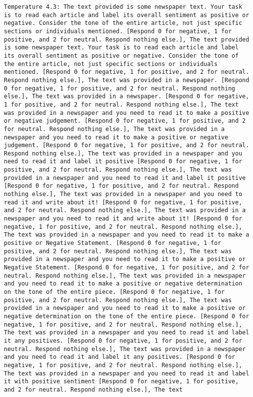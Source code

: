 \begin{lstlisting}[label=lst:poor_performing_prompts]
	Temperature 4.3: The text provided is some newspaper text. Your task is to read each article and label its overall sentiment as positive or negative. Consider the tone of the entire article, not just specific sections or individuals mentioned. [Respond 0 for negative, 1 for positive, and 2 for neutral. Respond nothing else.], The text provided is some newspaper text. Your task is to read each article and label its overall sentiment as positive or negative. Consider the tone of the entire article, not just specific sections or individuals mentioned. [Respond 0 for negative, 1 for positive, and 2 for neutral. Respond nothing else.], The text was provided in a newspaper. [Respond 0 for negative, 1 for positive, and 2 for neutral. Respond nothing else.], The text was provided in a newspaper. [Respond 0 for negative, 1 for positive, and 2 for neutral. Respond nothing else.], The text was provided in a newspaper and you need to read it to make a positive or negative judgement. [Respond 0 for negative, 1 for positive, and 2 for neutral. Respond nothing else.], The text was provided in a newspaper and you need to read it to make a positive or negative judgement. [Respond 0 for negative, 1 for positive, and 2 for neutral. Respond nothing else.], The text was provided in a newspaper and you need to read it and label it positive [Respond 0 for negative, 1 for positive, and 2 for neutral. Respond nothing else.], The text was provided in a newspaper and you need to read it and label it positive [Respond 0 for negative, 1 for positive, and 2 for neutral. Respond nothing else.], The text was provided in a newspaper and you need to read it and write about it! [Respond 0 for negative, 1 for positive, and 2 for neutral. Respond nothing else.], The text was provided in a newspaper and you need to read it and write about it! [Respond 0 for negative, 1 for positive, and 2 for neutral. Respond nothing else.], The text was provided in a newspaper and you need to read it to make a positive or Negative Statement. [Respond 0 for negative, 1 for positive, and 2 for neutral. Respond nothing else.], The text was provided in a newspaper and you need to read it to make a positive or Negative Statement. [Respond 0 for negative, 1 for positive, and 2 for neutral. Respond nothing else.], The text was provided in a newspaper and you need to read it to make a positive or negative determination on the tone of the entire piece. [Respond 0 for negative, 1 for positive, and 2 for neutral. Respond nothing else.], The text was provided in a newspaper and you need to read it to make a positive or negative determination on the tone of the entire piece. [Respond 0 for negative, 1 for positive, and 2 for neutral. Respond nothing else.], The text was provided in a newspaper and you need to read it and label it any positives. [Respond 0 for negative, 1 for positive, and 2 for neutral. Respond nothing else.], The text was provided in a newspaper and you need to read it and label it any positives. [Respond 0 for negative, 1 for positive, and 2 for neutral. Respond nothing else.], The text was provided in a newspaper and you need to read it and label it with positive sentiment [Respond 0 for negative, 1 for positive, and 2 for neutral. Respond nothing else.], The text 
\end{lstlisting}

